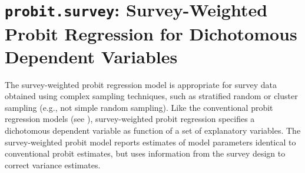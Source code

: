 \section{{\tt probit.survey}: Survey-Weighted Probit Regression for Dichotomous Dependent Variables}
\label{probit.survey}

The survey-weighted probit regression model is appropriate for 
survey data obtained using complex sampling techniques, such as 
stratified random or cluster sampling (e.g., not simple random 
sampling).  Like the conventional probit regression models (see 
), survey-weighted probit regression specifies a 
dichotomous dependent variable as function of a set of explanatory 
variables.  The survey-weighted probit model reports estimates of 
model parameters identical to conventional probit estimates, but uses 
information from the survey design to correct variance estimates.

